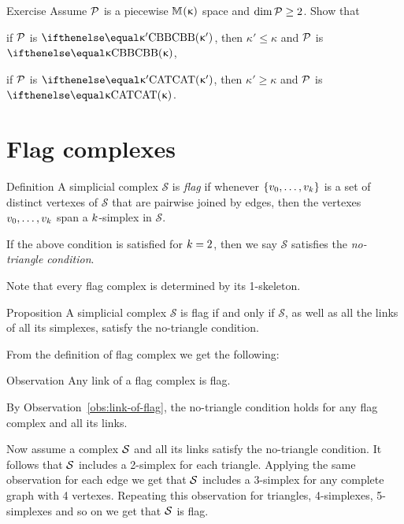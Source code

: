 \begin{thm}{Exercise}\label{ex:polyKk}
Assume $\mathcal{P}$ is a piecewise
$\mathbb{M}_{{}}^{}({\upkappa})$ space and $\dim \spc{P}\ge 2$. 
Show that 

\begin{subthm}{} if $\mathcal{P}$ is $\Alex{\kappa'}$, then $\kappa'\le \kappa$ and $\mathcal{P}$ is $\Alex{\kappa}$, 
\end{subthm}

\begin{subthm}{}
if $\mathcal{P}$ is $\CAT{\kappa'}$, then $\kappa'\ge \kappa$ and $\mathcal{P}$ is $\CAT\kappa$.
\end{subthm}

\end{thm}

\section{Flag complexes}


\begin{thm}{Definition}
A simplicial complex $\mathcal{S}$ 
is \emph{flag} if whenever $\{v_0,\z\dots,v_\kay\}$
is a set of distinct vertexes of $\mathcal{S}$
that are pairwise joined by edges, then the vertexes $v_0,\dots,v_\kay$
span a $k$-simplex in $\mathcal{S}$.

If the above condition is satisfied for $k=2$, 
then we say $\mathcal{S}$ satisfies 
the \emph{no-triangle condition}.
\end{thm}

Note that every flag complex is determined by its 1-skeleton.

\begin{thm}{Proposition}\label{prop:no-trig}
A simplicial complex $\mathcal{S}$ is flag if and only if 
$\mathcal{S}$, as well as all the links of all its simplexes,
satisfy the no-triangle condition.
\end{thm}

From the definition of flag complex 
we get the following:

\begin{thm}{Observation}\label{obs:link-of-flag}
Any link of a flag complex is flag.
\end{thm}


By Observation~\ref{obs:link-of-flag}, the no-triangle condition holds 
for any flag complex and all its links.

Now assume a complex $\mathcal{S}$ and all its links satisfy 
the no-triangle condition.
It follows that $\mathcal{S}$ includes a 2-simplex for each triangle.
Applying the same observation for each edge we get that $\mathcal{S}$ 
includes a 3-simplex for any complete graph with 4 vertexes.
Repeating this observation 
for triangles, 
4-simplexes,
5-simplexes
and so on we get that $\mathcal{S}$ is flag.
\qeds



